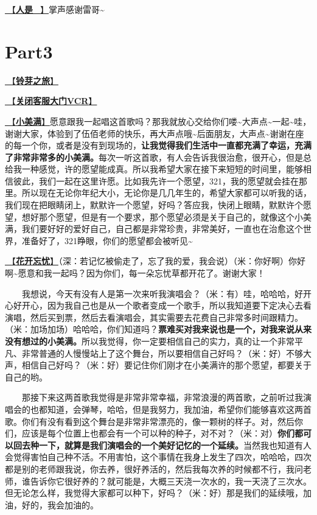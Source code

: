 \documentclass[]{ctexbook}
\begin{document}
\hyperref[renshi]{🎵【\textbf{人是\_}】}掌声感谢雷哥\textasciitilde{}

\section{Part3}\label{shanghai-20240519-part3}

\hyperref[travel-lingya]{🎵【\textbf{铃芽之旅}】}

\hyperref[close-door-vcr]{🎥【\textbf{关闭客服大门VCR}】}

\hyperref[happy-ending]{🎵【\textbf{小美满}】}愿意跟我一起唱这首歌吗？那我就放心交给你们喽\textasciitilde 大声点\textasciitilde 一起\textasciitilde 哇，谢谢大家，体验到了伍佰老师的快乐，再大声点哦\textasciitilde 后面朋友，大声点\textasciitilde 谢谢在座的每一个你，或者是没有到现场的，\textbf{让我觉得我们生活中一直都充满了幸运，充满了非常非常多的小美满。}每次一听这首歌，有人会告诉我很治愈，很开心，但是总给我一种感觉，许的愿望能成真。所以我希望大家在接下来短短的时间里，能够相信彼此，我们一起在这里许愿。比如我先许一个愿望，321，我的愿望就会挂在那里。所以现在无论你年纪大小，无论你是几几年生的，希望大家都可以听我的话，我们现在把眼睛闭上，默默许一个愿望，好吗？答应我，快闭上眼睛，默默许个愿望，想好那个愿望，但是有一个要求，那个愿望必须是关于自己的，就像这个小美满，我们要好好的爱好自己，自己都是非常珍贵，非常美好，一直也在治愈这个世界，准备好了，321睁眼，你们的愿望都会被听见\textasciitilde{}

\hyperref[no-worries]{🎵【\textbf{花开忘忧}】}（深：若记忆被偷走了，忘了我的爱，我会说）（米：你好啊）你好啊\textasciitilde 愿意和我一起吗？因为你们，每一朵忘忧草都开花了。谢谢大家！

  我想说，今天有没有人是第一次来听我演唱会？（米：有）哇，哈哈哈，好开心好开心，因为我自己也是从一个歌者变成一个歌手，所以我知道要下定决心去看演唱，然后买到票，然后去看演唱会，其实需要去花费自己非常多时间跟精力。（米：加场加场）哈哈哈，你们知道吗？\textbf{票难买对我来说也是一个，对我来说从来没有想过的小美满。}所以我觉得，你一定要相信自己的实力，真的让一个非常平凡、非常普通的人慢慢站上了这个舞台，所以要相信自己好吗？（米：好）不够大声，相信自己好吗？（米：好）要记住你们刚才在小美满许的那个愿望，都要关于自己的哟。

  那接下来这两首歌我觉得是非常非常幸福，非常浪漫的两首歌，之前听过我演唱会的也都知道，会弹琴，哈哈，但是我努力，我加油，希望你们能够喜欢这两首歌。你们有没有看到这个舞台是非常非常漂亮的，像一颗树的样子。对，然后你们，应该是每个位置上也都会有一个可以种的种子，对不对？（米：对）\textbf{你们都可以回去种一下，就算是我们演唱会的一个美好记忆的一个延续。}当然我也知道有人会觉得害怕自己种不活。不用害怕，这个事情在我身上发生了四次，哈哈哈，四次都是别的老师跟我说，你去养，很好养活的，然后我每次养的时候都不行，我问老师，谁告诉你它很好养的？就可能是，大概三天浇一次水的，我一天浇了三次水。但无论怎么样，我觉得大家都可以种下，好吗？（米：好）那是我们的延续哦，加油，好的，我会加油的。
\end{document}
